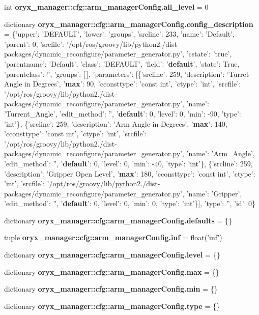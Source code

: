 \begin{DoxyCompactItemize}
\item 
int {\bf oryx\-\_\-manager\-::cfg\-::arm\-\_\-manager\-Config.\-all\-\_\-level} = 0
\item 
dictionary {\bf oryx\-\_\-manager\-::cfg\-::arm\-\_\-manager\-Config.\-config\-\_\-description} = \{'upper'\-: '\-D\-E\-F\-A\-U\-L\-T', 'lower'\-: 'groups', 'srcline'\-: 233, 'name'\-: '\-Default', 'parent'\-: 0, 'srcfile'\-: '/opt/ros/groovy/lib/python2./dist-\/packages/dynamic\-\_\-reconfigure/parameter\-\_\-generator.\-py', 'cstate'\-: 'true', 'parentname'\-: '\-Default', 'class'\-: '\-D\-E\-F\-A\-U\-L\-T', 'field'\-: '{\bf default}', 'state'\-: \-True, 'parentclass'\-: '', 'groups'\-: [$\,$], 'parameters'\-: [\{'srcline'\-: 259, 'description'\-: '\-Turret \-Angle in \-Degrees', '{\bf max}'\-: 90, 'cconsttype'\-: 'const int', 'ctype'\-: 'int', 'srcfile'\-: '/opt/ros/groovy/lib/python2./dist-\/packages/dynamic\-\_\-reconfigure/parameter\-\_\-generator.\-py', 'name'\-: '\-Turrent\-\_\-\-Angle', 'edit\-\_\-method'\-: '', '{\bf default}'\-: 0, 'level'\-: 0, 'min'\-: -\/90, 'type'\-: 'int'\}, \{'srcline'\-: 259, 'description'\-: '\-Arm \-Angle in \-Degrees', '{\bf max}'\-: 140, 'cconsttype'\-: 'const int', 'ctype'\-: 'int', 'srcfile'\-: '/opt/ros/groovy/lib/python2./dist-\/packages/dynamic\-\_\-reconfigure/parameter\-\_\-generator.\-py', 'name'\-: '\-Arm\-\_\-\-Angle', 'edit\-\_\-method'\-: '', '{\bf default}'\-: 0, 'level'\-: 0, 'min'\-: -\/40, 'type'\-: 'int'\}, \{'srcline'\-: 259, 'description'\-: '\-Gripper \-Open \-Level', '{\bf max}'\-: 180, 'cconsttype'\-: 'const int', 'ctype'\-: 'int', 'srcfile'\-: '/opt/ros/groovy/lib/python2./dist-\/packages/dynamic\-\_\-reconfigure/parameter\-\_\-generator.\-py', 'name'\-: '\-Gripper', 'edit\-\_\-method'\-: '', '{\bf default}'\-: 0, 'level'\-: 0, 'min'\-: 0, 'type'\-: 'int'\}], 'type'\-: '', 'id'\-: 0\}
\item 
dictionary {\bf oryx\-\_\-manager\-::cfg\-::arm\-\_\-manager\-Config.\-defaults} = \{\}
\item 
tuple {\bf oryx\-\_\-manager\-::cfg\-::arm\-\_\-manager\-Config.\-inf} = float('inf')
\item 
dictionary {\bf oryx\-\_\-manager\-::cfg\-::arm\-\_\-manager\-Config.\-level} = \{\}
\item 
dictionary {\bf oryx\-\_\-manager\-::cfg\-::arm\-\_\-manager\-Config.\-max} = \{\}
\item 
dictionary {\bf oryx\-\_\-manager\-::cfg\-::arm\-\_\-manager\-Config.\-min} = \{\}
\item 
dictionary {\bf oryx\-\_\-manager\-::cfg\-::arm\-\_\-manager\-Config.\-type} = \{\}
\end{DoxyCompactItemize}
